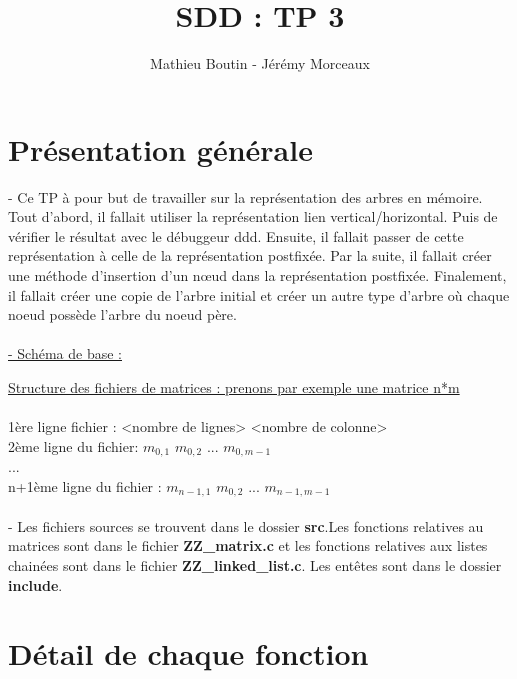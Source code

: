 \documentclass[a4paper]{article}
\title{SDD : TP 3}
\author{Mathieu Boutin - Jérémy Morceaux}
\begin{document}
\maketitle
\section{Présentation générale}
- Ce TP à pour but de travailler sur la représentation des arbres en mémoire. Tout d'abord, il fallait utiliser la représentation lien vertical/horizontal. Puis de vérifier le résultat avec le débuggeur ddd. Ensuite, il fallait passer de cette représentation à celle de la représentation postfixée. Par la suite, il fallait créer une méthode d'insertion d'un nœud dans la représentation postfixée. Finalement, il fallait créer une copie de l'arbre initial et créer un autre type d'arbre où chaque noeud possède l'arbre du noeud père.
\\
\\
\underline{- Schéma de base :}
\begin{center}

\end{center}

\underline{Structure des fichiers de matrices : prenons par exemple une matrice n*m}
\\
\\
1ère ligne fichier : <nombre de lignes> <nombre de colonne>
\\
2ème ligne du fichier: $m_{0,1}$ $m_{0,2}$  ... $m_{0,m-1}$
\\
...
\\
n+1ème ligne du fichier : $m_{n-1,1}$ $m_{0,2}$  ... $m_{n-1,m-1}$
\\
\\
- Les fichiers sources se trouvent dans le dossier \textbf{src}.Les fonctions relatives au matrices sont dans le fichier \textbf{ZZ\_matrix.c} et les fonctions relatives aux listes chainées sont dans le fichier \textbf{ZZ\_linked\_list.c}. Les entêtes sont dans le dossier \textbf{include}.

\section{Détail de chaque fonction}
\end{document}
